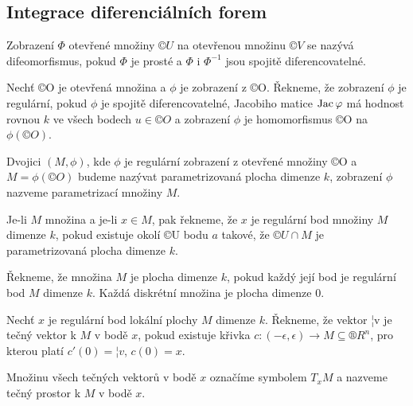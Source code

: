 \documentclass[12pt]{article}                   %
\begin{document}
    \subsection{Integrace diferenciálních forem}
        \begin{poznamka}
            Zobrazení $\Phi$ otevřené množiny $©U$ na otevřenou množinu $©V$ se nazývá difeomorfismus, pokud $\Phi$ je prosté a $\Phi$ i $\Phi^{-1}$ jsou spojitě diferencovatelné.
        \end{poznamka}

        \begin{definice}[regulární]
            Nechť ©O je otevřená množina a $\phi$ je zobrazení z ©O. Řekneme, že zobrazení $\phi$ je regulární, pokud $\phi$ je spojitě diferencovatelné, Jacobiho matice $\operatorname{Jac}\varphi$ má hodnost rovnou $k$ ve všech bodech $u \in ©O$ a zobrazení $\phi$ je homomorfismus ©O na $\phi(©O)$.
        \end{definice}

        \begin{definice}
            Dvojici $(M, \phi)$, kde $\phi$ je regulární zobrazení z otevřené množiny ©O a $M = \phi(©O)$ budeme nazývat parametrizovaná plocha dimenze $k$, zobrazení $\phi$ nazveme parametrizací množiny $M$.

            Je-li $M$ množina a je-li $x \in M$, pak řekneme, že $x$ je regulární bod množiny $M$ dimenze $k$, pokud existuje okolí ©U bodu $a$ takové, že $©U \cap M$ je parametrizovaná plocha dimenze $k$.
        \end{definice}

        \begin{definice}
            Řekneme, že množina $M$ je plocha dimenze $k$, pokud každý její bod je regulární bod $M$ dimenze $k$. Každá diskrétní množina je plocha dimenze 0.
        \end{definice}

        \begin{definice}
            Nechť $x$ je regulární bod lokální plochy $M$ dimenze $k$. Řekneme, že vektor ¦v je tečný vektor k $M$ v bodě $x$, pokud existuje křivka $c: (-\epsilon, \epsilon) \rightarrow M \subseteq ®R^n$, pro kterou platí $c'(0) = ¦v$, $c(0) = x$.

            Množinu všech tečných vektorů v bodě $x$ označíme symbolem $T_xM$ a nazveme tečný prostor k $M$ v bodě $x$.
        \end{definice}
\end{document}
